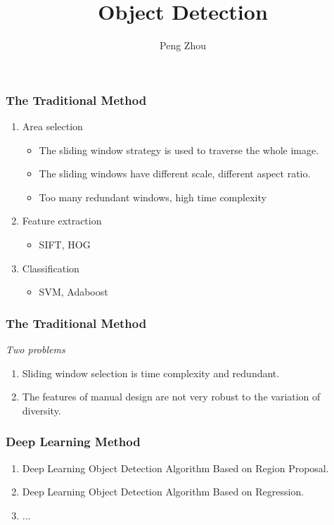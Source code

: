 \documentclass{beamer}
\begin{document}
\title{Object Detection}
\author{Peng Zhou}
\maketitle{}

\begin{frame}
  \frametitle{The Traditional Method}
  \begin{enumerate}

  \item Area selection
    \begin{itemize}
    \item The sliding window strategy is used to traverse the whole image. 
    \item The sliding windows have different scale, different aspect ratio.
    \item Too many redundant windows, high time complexity
    \end{itemize}

  \item Feature extraction
    \begin{itemize}
    \item SIFT, HOG
    \end{itemize}

  \item Classification
    \begin{itemize}
    \item SVM, Adaboost
    \end{itemize}
  \end{enumerate}
\end{frame}

\begin{frame}
  \frametitle{The Traditional Method}
  \emph{Two problems}
  \begin{enumerate}
  \item Sliding window selection is time complexity and redundant.
  \item The features of manual design are not very robust to the variation of diversity.
  \end{enumerate}
\end{frame}

\begin{frame}
  \frametitle{Deep Learning Method}
\begin{block}{}
  \begin{enumerate}
  \item Deep Learning Object Detection Algorithm Based on Region Proposal.
  \item Deep Learning Object Detection Algorithm Based on Regression.
  \item ...
  \end{enumerate}
\end{block}
\end{frame}
\end{document}
